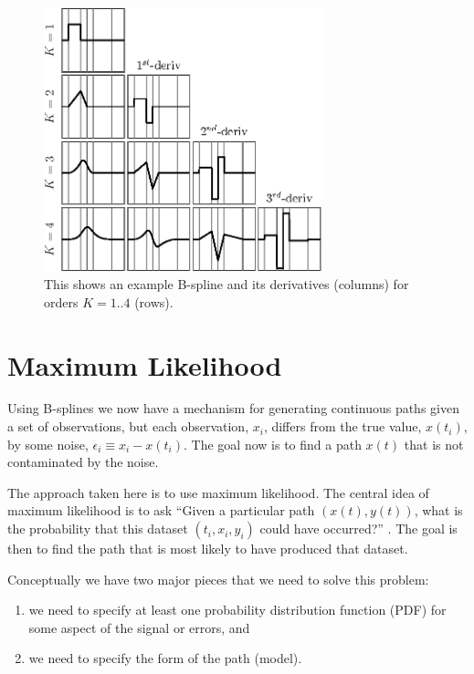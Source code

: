 \documentclass[twocol]{ametsoc}
\begin{document}
\begin{figure}
  \centerline{\includegraphics[width=19pc,angle=0]{bsplines}}
  \caption{This shows an example B-spline and its derivatives (columns) for orders $K=1..4$ (rows).}
  \label{bsplines}
\end{figure}


%
\section{Maximum Likelihood}
%

Using B-splines we now have a mechanism for generating continuous paths given a set of observations, but each observation, $x_i$, differs from the true value, $x(t_i)$, by some noise, $\epsilon_i \equiv x_i - x(t_i)$. The goal now is to find a path $x(t)$ that is not contaminated by the noise.

The approach taken here is to use maximum likelihood. The central idea of maximum likelihood is to ask ``Given a particular path $(x(t),y(t))$, what is the probability that this dataset $(t_i,x_i, y_i)$ could have occurred?'' \citep{press1992-book}. The goal is then to find the path that is most likely to have produced that dataset.

Conceptually we have two major pieces that we need to solve this problem:
\begin{enumerate}
\item we need to specify at least one probability distribution function (PDF) for some aspect of the signal or errors, and
\item we need to specify the form of the path (model).
\end{enumerate}
\end{document}
